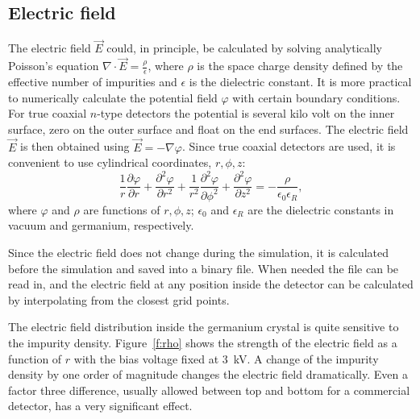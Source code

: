 \documentclass[epj]{svjour}
\begin{document}
\subsection{Electric field}
\label{s:field}
The electric field $\vec{E}$ could, in principle, be calculated by
solving analytically Poisson's equation $\nabla \cdot \vec{E} =
\frac{\rho}{\epsilon}$, where $\rho$ is the space charge density
defined by the effective number of impurities and $\epsilon$ is the
dielectric constant. It is more practical to numerically calculate the
potential field $\varphi$ with certain boundary conditions. For true
coaxial $n$-type detectors the potential is several kilo volt on the
inner surface, zero on the outer surface and float on the end
surfaces. The electric field $\vec{E}$ is then obtained using $\vec{E}
= - \nabla \varphi$. Since true coaxial detectors are used, it is
convenient to use cylindrical coordinates, $r, \phi, z$:
\begin{equation} 
\frac{1}{r} \frac{\partial \varphi}{\partial r} + 
\frac{\partial^{2} \varphi}{\partial r^{2}} + 
\frac{1}{r^{2}} \frac{\partial^{2} \varphi}{\partial \phi^{2}} + 
\frac{\partial^{2} \varphi}{\partial z^{2}} = 
- \frac{\rho}{\epsilon_{0} \epsilon_{R}}, 
\label{e:pocyl} 
\end{equation} 
where $\varphi$ and $\rho$ are functions of $r, \phi, z$;
$\epsilon_{0}$ and $\epsilon_{R}$ are the dielectric constants in
vacuum and germanium, respectively.

Since the electric field does not change during the simulation, it is
calculated before the simulation and saved into a binary file. When
needed the file can be read in, and the electric field at any position
inside the detector can be calculated by interpolating from the
closest grid points.
 
The electric field distribution inside the germanium crystal is quite
sensitive to the impurity density. Figure~\ref{f:rho} shows the
strength of the electric field as a function of $r$ with the bias
voltage fixed at 3~kV. A change of the impurity density by one order
of magnitude changes the electric field dramatically. Even a factor
three difference, usually allowed between top and bottom for a
commercial detector, has a very significant effect.
 
\end{document}
